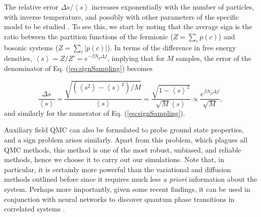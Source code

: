 The relative error $\Delta s / \left\langle s \right\rangle$ increases exponentially with the number of particles, with inverse temperature, and possibly with other parameters of the specific model to be studied \cite{troyer_computational_2005, hou_numerical_2009}.
To see this, we start by noting that the average sign is the ratio between the partition functions of the fermionic ($Z = \sum_c p(c)$) and bosonic systems ($Z = \sum_c | p ( c ) |$).
In terms of the difference in free energy densities, $\left\langle s \right\rangle = Z / Z' = e^{-\beta N_p \Delta f}$, implying that for $M$ samples, the error of the denominator of Eq. (\ref{eq:signSampling}) becomes

\begin{equation}
\frac{\Delta s}{\left\langle s \right\rangle} = \frac{\sqrt{(\left\langle s^2 \right\rangle - \left\langle s \right\rangle^2 )/ M }}{\left\langle s \right\rangle} = \frac{ \sqrt{ 1 - \left\langle s \right\rangle^2}  }{\sqrt{M} \left\langle s \right\rangle} \propto \frac{e^{\beta N_p \Delta f}}{\sqrt{M}} ,
\end{equation}
and similarly for the numerator of Eq. (\ref{eq:signSampling}).

Auxiliary field \acs{QMC} can also be formulated to probe ground state properties, and a sign problem arises similarly.
Apart from this problem, which plagues all \acs{QMC} methods, this method is one of the most robust, unbiased, and reliable methods, hence we choose it to carry out our simulations.
Note that, in particular, it is certainly more powerful than the variational and diffusion methods outlined before since it requires much less \emph{a priori} information about the system.
Perhaps more importantly, given some recent findings, it can be used in conjunction with neural networks to discover quantum phase transitions in correlated systems  \cite{broecker_machine_2017}.